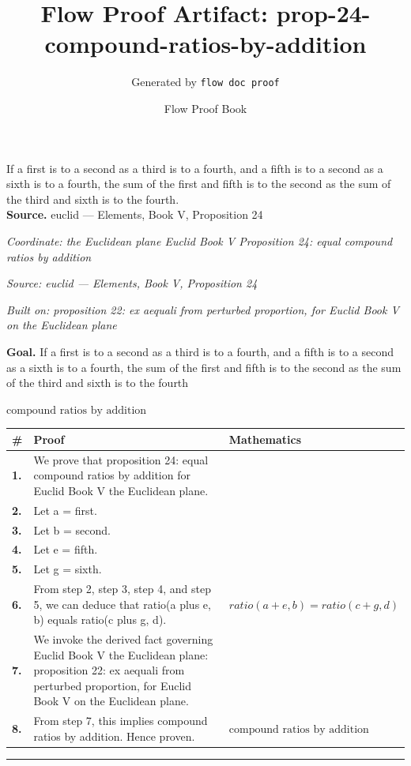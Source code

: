 \documentclass[11pt]{article}
\title{Flow Proof Artifact: prop-24-compound-ratios-by-addition}
\author{Generated by \texttt{flow doc proof}}
\date{Flow Proof Book}
\theoremstyle{definition}
\begin{document}
\maketitle
If a first is to a second as a third is to a fourth, and a fifth is to a second as a sixth is to a fourth, the sum of the first and fifth is to the second as the sum of the third and sixth is to the fourth.\\[0.5em]
\textbf{Source.} euclid — Elements, Book V, Proposition 24\\[0.5em]
\bigskip
{}\par
\smallskip\noindent\textit{Coordinate: the Euclidean plane \cdot Euclid Book V \cdot Proposition 24: equal compound ratios by addition}\par
\smallskip\noindent\textit{Source: euclid — Elements, Book V, Proposition 24}\par
\smallskip\noindent\textit{Built on: proposition 22: ex aequali from perturbed proportion, for Euclid Book V on the Euclidean plane}\par
\medskip
\noindent\textbf{Goal.} If a first is to a second as a third is to a fourth, and a fifth is to a second as a sixth is to a fourth, the sum of the first and fifth is to the second as the sum of the third and sixth is to the fourth\par
\noindent$\displaystyle \text{compound ratios by addition}$\par
\medskip
\noindent
\begin{tabular}{@{} >{\raggedright\arraybackslash}p{} >{\raggedright\arraybackslash}p{} >{\raggedleft\arraybackslash}p{} @{}}
\textbf{\#} & \textbf{Proof} & \textbf{Mathematics} \\
\midrule
\textbf{1.} & We prove that proposition 24: equal compound ratios by addition for Euclid Book V the Euclidean plane. & \\[0.45em]
\textbf{2.} & Let a = first. & \\[0.45em]
\textbf{3.} & Let b = second. & \\[0.45em]
\textbf{4.} & Let e = fifth. & \\[0.45em]
\textbf{5.} & Let g = sixth. & \\[0.45em]
\textbf{6.} & From step 2, step 3, step 4, and step 5, we can deduce that ratio(a plus e, b) equals ratio(c plus g, d). & $\displaystyle ratio(a + e, b) = ratio(c + g, d)$ \\[0.45em]
\textbf{7.} & We invoke the derived fact governing Euclid Book V the Euclidean plane: proposition 22: ex aequali from perturbed proportion, for Euclid Book V on the Euclidean plane. & \\[0.45em]
\textbf{8.} & From step 7, this implies compound ratios by addition. Hence proven. & $\displaystyle \text{compound ratios by addition}$ \\[0.45em]
\bottomrule
\end{tabular}
\label{thm:Geometry-Euclid Book V-proposition_24_equal_compound_ratios_by_addition}
\par\medskip\hrule
\end{document}
